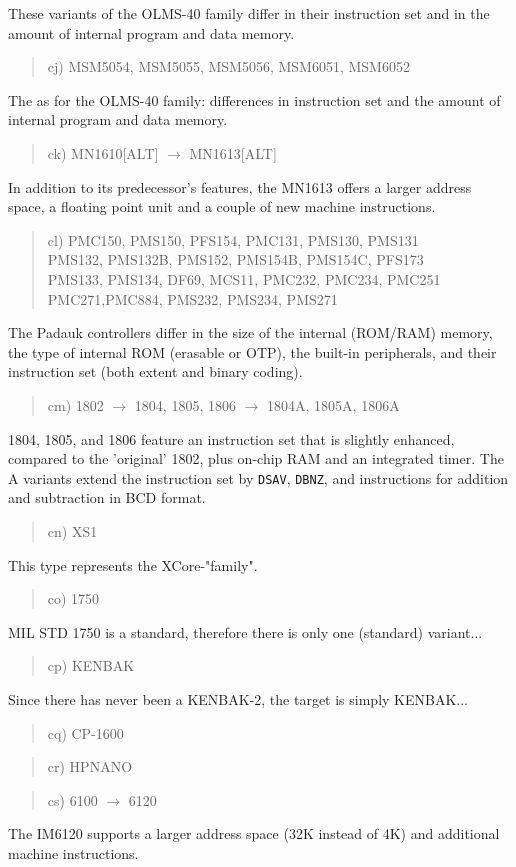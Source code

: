 \documentclass[12pt,twoside]{report}
\newcommand{\tty}[1]{{\tt #1}}
\begin{document}
These variants of the OLMS-40 family differ in their instruction
set and in the amount of internal program and data memory.
\begin{quote}
cj) MSM5054, MSM5055, MSM5056, MSM6051, MSM6052
\end{quote}
The as for the OLMS-40 family: differences in instruction
set and the amount of internal program and data memory.
\begin{quote}
ck) MN1610[ALT] $\rightarrow$ MN1613[ALT]
\end{quote}
In addition to its predecessor's features, the MN1613 offers a larger
address space, a floating point unit and a couple of new machine
instructions.
\begin{quote}
cl) PMC150, PMS150, PFS154, PMC131, PMS130, PMS131 \\
PMS132, PMS132B, PMS152, PMS154B, PMS154C, PFS173 \\
PMS133, PMS134, DF69, MCS11, PMC232, PMC234, PMC251 \\
PMC271,PMC884, PMS232, PMS234, PMS271
\end{quote}
The Padauk controllers differ in the size of the internal
(ROM/RAM) memory, the type of internal ROM (erasable or OTP),
the built-in peripherals, and their instruction set (both
extent and binary coding).
\begin{quote}
cm) 1802 $\rightarrow$ 1804, 1805, 1806 $\rightarrow$ 1804A,
1805A, 1806A
\end{quote}
1804, 1805, and 1806 feature an instruction set that is slightly
enhanced, compared to the 'original' 1802, plus on-chip RAM and
an integrated timer.  The A variants extend the instruction set by
\tty{DSAV}, \tty{DBNZ}, and instructions for addition and
subtraction in BCD format.
\begin{quote}
cn) XS1
\end{quote}
This type represents the XCore-"family".
\begin{quote}
co) 1750
\end{quote}
MIL STD 1750 is a standard, therefore there is only one
(standard) variant...
\begin{quote}
cp) KENBAK
\end{quote}
Since there has never been a KENBAK-2, the target is simply KENBAK...
\begin{quote}
cq) CP-1600
\end{quote}
\begin{quote}
cr) HPNANO
\end{quote}
\begin{quote}
cs) 6100 $\rightarrow$ 6120
\end{quote}
The IM6120 supports a larger address space (32K
instead of 4K) and additional machine instructions.
\end{document}

